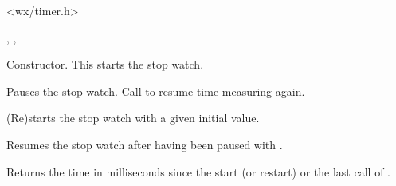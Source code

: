 
<wx/timer.h>


, , 




Constructor. This starts the stop watch.

\label{wxstopwatchpause}


Pauses the stop watch. Call  to resume 
time measuring again.



(Re)starts the stop watch with a given initial value.

\label{wxstopwatchresume}


Resumes the stop watch after having been paused with .


\label{wxstopwatchtime}

Returns the time in milliseconds since the start (or restart) or the last call of 
.
